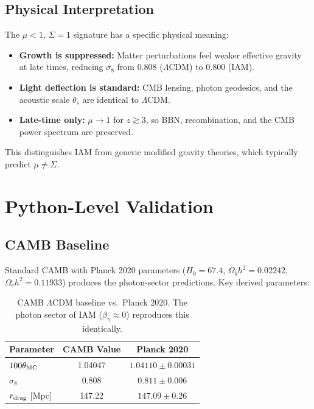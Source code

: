 \documentclass[11pt,letterpaper]{article}
\begin{document}
\subsection{Physical Interpretation}

The $\mu < 1$, $\Sigma = 1$ signature has a specific physical meaning:
\begin{itemize}
\item \textbf{Growth is suppressed:} Matter perturbations feel weaker effective gravity at late times, reducing $\sigma_8$ from 0.808 ($\Lambda$CDM) to 0.800 (IAM).
\item \textbf{Light deflection is standard:} CMB lensing, photon geodesics, and the acoustic scale $\theta_s$ are identical to $\Lambda$CDM.
\item \textbf{Late-time only:} $\mu \to 1$ for $z \gtrsim 3$, so BBN, recombination, and the CMB power spectrum are preserved.
\end{itemize}

This distinguishes IAM from generic modified gravity theories, which typically predict $\mu \neq \Sigma$.

\section{Python-Level Validation}

\subsection{CAMB Baseline}

Standard CAMB with Planck 2020 parameters ($H_0 = 67.4$, $\Omega_b h^2 = 0.02242$, $\Omega_c h^2 = 0.11933$) produces the photon-sector predictions. Key derived parameters:

\begin{table}[h]
\centering
\begin{tabular}{lcc}
\toprule
Parameter & CAMB Value & Planck 2020 \\
\midrule
$100\theta_{\rm MC}$ & 1.04047 & $1.04110 \pm 0.00031$ \\
$\sigma_8$ & 0.808 & $0.811 \pm 0.006$ \\
$r_{\rm drag}$ [Mpc] & 147.22 & $147.09 \pm 0.26$ \\
\bottomrule
\end{tabular}
\caption{CAMB $\Lambda$CDM baseline vs.\ Planck 2020. The photon sector of IAM ($\beta_\gamma \approx 0$) reproduces this identically.}
\end{table}
\end{document}
